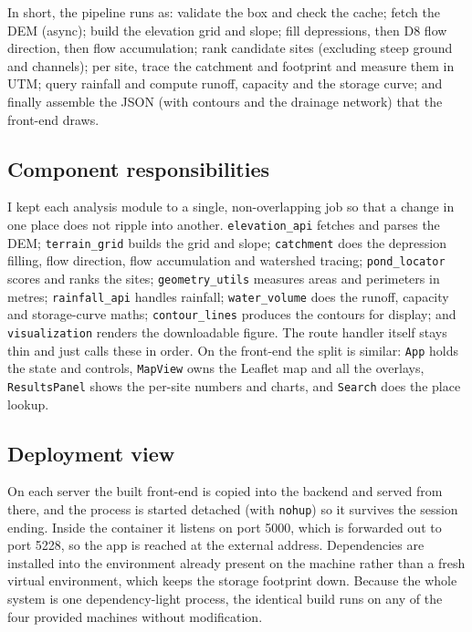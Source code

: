 \documentclass[manuscript,screen]{acmart}
\begin{document}
In short, the pipeline runs as: validate the box and check the cache; fetch the DEM
(async); build the elevation grid and slope; fill depressions, then D8 flow
direction, then flow accumulation; rank candidate sites (excluding steep ground and
channels); per site, trace the catchment and footprint and measure them in UTM;
query rainfall and compute runoff, capacity and the storage curve; and finally
assemble the JSON (with contours and the drainage network) that the front-end draws.

\subsection{Component responsibilities}
I kept each analysis module to a single, non-overlapping job so that a change in
one place does not ripple into another. \texttt{elevation\_api} fetches and parses
the DEM; \texttt{terrain\_grid} builds the grid and slope; \texttt{catchment} does
the depression filling, flow direction, flow accumulation and watershed tracing;
\texttt{pond\_locator} scores and ranks the sites; \texttt{geometry\_utils}
measures areas and perimeters in metres; \texttt{rainfall\_api} handles rainfall;
\texttt{water\_volume} does the runoff, capacity and storage-curve maths;
\texttt{contour\_lines} produces the contours for display; and
\texttt{visualization} renders the downloadable figure. The route handler itself
stays thin and just calls these in order. On the front-end the split is similar:
\texttt{App} holds the state and controls, \texttt{MapView} owns the Leaflet map and
all the overlays, \texttt{ResultsPanel} shows the per-site numbers and charts, and
\texttt{Search} does the place lookup.

\subsection{Deployment view}
On each server the built front-end is copied into the backend and served from
there, and the process is started detached (with \texttt{nohup}) so it survives the
session ending. Inside the container it listens on port 5000, which is forwarded
out to port 5228, so the app is reached at the external address. Dependencies are
installed into the environment already present on the machine rather than a fresh
virtual environment, which keeps the storage footprint down. Because the whole
system is one dependency-light process, the identical build runs on any of the four
provided machines without modification.
\end{document}
